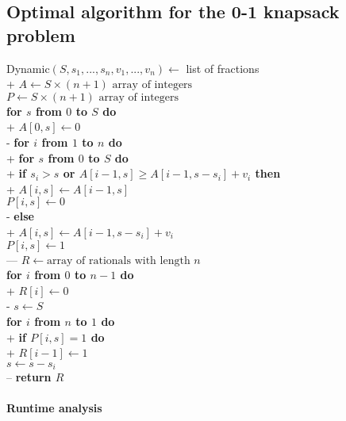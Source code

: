 \documentclass{article}
\begin{document}
\subsection{Optimal algorithm for the 0-1 knapsack problem}

\begin{pseudo}
	Dynamic$(S,s_1,...,s_n,v_1,...,v_n)\leftarrow$ list of fractions\\+
	$A\leftarrow S\times (n+1)\text{ array of integers}$\\
	$P\leftarrow S\times (n+1)\text{ array of integers}$\\
	\textbf{for $s$ from $0$ to $S$ do}\\+
	$A[0,s] \leftarrow 0$\\-
	\textbf{for $i$ from $1$ to $n$ do}\\+
	\textbf{for $s$ from $0$ to $S$ do}\\+
	\textbf{if $s_i>s$ or $A[i-1,s]\geq A[i-1,s-s_i] + v_i$ then}\\+
	$A[i, s] \leftarrow A[i-1,s]$\\
	$P[i, s] \leftarrow 0$\\-
	\textbf{else}\\+
	$A[i, s] \leftarrow A[i-1,s-s_i] + v_i$\\
	$P[i, s] \leftarrow 1$\\---
	$R\leftarrow \text{array of rationals with length }n$\\
	\textbf{for $i$ from $0$ to $n-1$ do}\\+
	$R[i] \leftarrow 0$\\-
	$s\leftarrow S$\\
	\textbf{for $i$ from $n$ to $1$ do}\\+
	\textbf{if $P[i,s]=1$ do}\\+
	$R[i-1]\leftarrow 1$\\
	$s \leftarrow s - s_i$\\--
	\textbf{return $R$}
\end{pseudo}

\paragraph{Runtime analysis}
\end{document}
